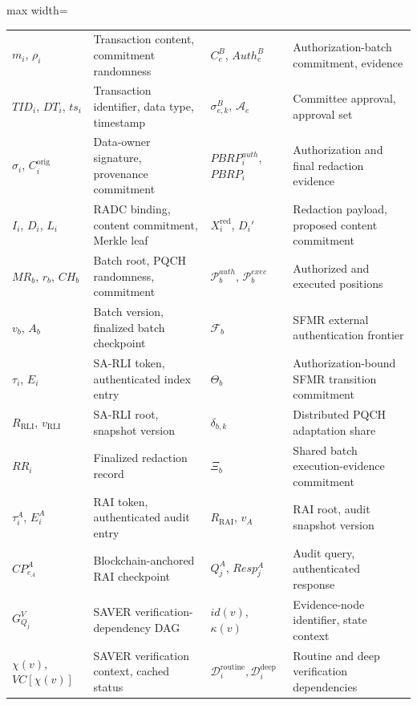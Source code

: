 \documentclass[lettersize,journal]{IEEEtran}
\begin{document}
\begin{table}[t]
\begin{adjustbox}{max width=\textwidth}
\begin{tabular}{@{}ll@{\quad}ll@{}}
$m_i$, $\rho_i$
& Transaction content, commitment randomness &
$C_e^B$, $Auth_e^B$
& Authorization-batch commitment, evidence\\

$TID_i$, $DT_i$, $ts_i$
& Transaction identifier, data type, timestamp &
$\sigma_{e,k}^B$, $\mathcal{A}_e$
& Committee approval, approval set\\

$\sigma_i$, $C_i^{\mathrm{orig}}$
& Data-owner signature, provenance commitment &
$PBRP_i^{auth}$, $PBRP_i$
& Authorization and final redaction evidence\\

$I_i$, $D_i$, $L_i$
& RADC binding, content commitment, Merkle leaf &
$X_i^{\mathrm{red}}$, $D_i'$
& Redaction payload, proposed content commitment\\

$MR_b$, $r_b$, $CH_b$
& Batch root, PQCH randomness, commitment &
$\mathcal{P}_b^{auth}$, $\mathcal{P}_b^{exec}$
& Authorized and executed positions\\

$v_b$, $A_b$
& Batch version, finalized batch checkpoint &
$\mathcal{F}_b$
& SFMR external authentication frontier\\

$\tau_i$, $E_i$
& SA-RLI token, authenticated index entry &
$\Theta_b$
& Authorization-bound SFMR transition commitment\\

$R_{\mathrm{RLI}}$, $v_{\mathrm{RLI}}$
& SA-RLI root, snapshot version &
$\delta_{b,k}$
& Distributed PQCH adaptation share\\

$RR_i$
& Finalized redaction record &
$\Xi_b$
& Shared batch execution-evidence commitment\\

$\tau_i^A$, $E_i^A$
& RAI token, authenticated audit entry &
$R_{\mathrm{RAI}}$, $v_A$
& RAI root, audit snapshot version\\

$CP_{e_A}^A$
& Blockchain-anchored RAI checkpoint &
$Q_j^A$, $Resp_j^A$
& Audit query, authenticated response\\

$G_{Q_j}^{V}$
& SAVER verification-dependency DAG &
$id(v)$, $\kappa(v)$
& Evidence-node identifier, state context\\

$\chi(v)$, $VC[\chi(v)]$
& SAVER verification context, cached status &
$\mathcal{D}_i^{\mathrm{routine}},
 \mathcal{D}_i^{\mathrm{deep}}$
& Routine and deep verification dependencies\\

\hline
\end{tabular}
\end{adjustbox}
\end{table}
    
\end{document}

